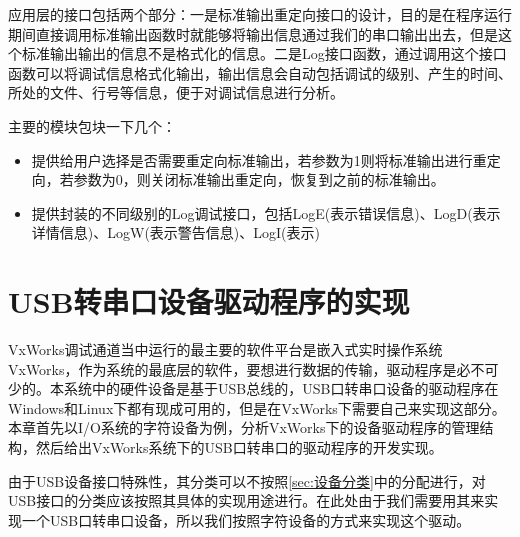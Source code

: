 应用层的接口包括两个部分：一是标准输出重定向接口的设计，目的是在程序运行期间直接调用标准输出函数时就能够将输出信息通过我们的串口输出出去，但是这个标准输出输出的信息不是格式化的信息。二是Log接口函数，通过调用这个接口函数可以将调试信息格式化输出，输出信息会自动包括调试的级别、产生的时间、所处的文件、行号等信息，便于对调试信息进行分析。

主要的模块包块一下几个：
\begin{itemize}
\item {} 提供给用户选择是否需要重定向标准输出，若参数为1则将标准输出进行重定向，若参数为0，则关闭标准输出重定向，恢复到之前的标准输出。

\item {} 提供封装的不同级别的Log调试接口，包括LogE(表示错误信息)、LogD(表示详情信息)、LogW(表示警告信息)、LogI(表示)
\end{itemize}




\section{USB转串口设备驱动程序的实现}
	VxWorks调试通道当中运行的最主要的软件平台是嵌入式实时操作系统VxWorks，作为系统的最底层的软件，要想进行数据的传输，驱动程序是必不可少的。本系统中的硬件设备是基于USB总线的，USB口转串口设备的驱动程序在Windows和Linux下都有现成可用的，但是在VxWorks下需要自己来实现这部分。本章首先以I/O系统的字符设备为例，分析VxWorks下的设备驱动程序的管理结构，然后给出VxWorks系统下的USB口转串口的驱动程序的开发实现。
		
		
	由于USB设备接口特殊性，其分类可以不按照\autoref{sec:设备分类}中的分配进行，对USB接口的分类应该按照其具体的实现用途进行。在此处由于我们需要用其来实现一个USB口转串口设备，所以我们按照字符设备的方式来实现这个驱动。
	
		
	
